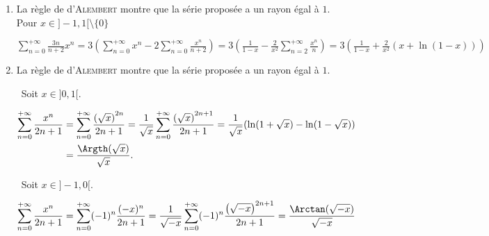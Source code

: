 {{\begin{enumerate}
\begin{center}
$f(x) =\sum_{n=2}^{+\infty}\left(\frac{1}{n-1}-\frac{1}{n}\right)x^n =x\sum_{n=2}^{+\infty}\frac{x^{n-1}}{n-1}-\sum_{n=2}^{+\infty}\frac{x^n}{n}=-x\ln(1-x) +\ln(1-x) + x$.
\end{center}

\begin{center}
\shadowbox{
$\forall x\in]-1,1[$, $\sum_{n=2}^{+\infty}\frac{x^n}{n(n-1)}=-x\ln(1-x) +\ln(1-x) + x$.
}
\end{center}

\item  La règle de d'\textsc{Alembert} montre que la série proposée a un rayon égal à $1$.
Pour $x\in]-1,1[\setminus\{0\}$

\begin{center}
$\sum_{n=0}^{+\infty}\frac{3n}{n+2}x^n =3\left(\sum_{n=0}^{+\infty}x^n - 2\sum_{n=0}^{+\infty}\frac{x^n}{n+2}\right) = 3\left(\frac{1}{1-x}- \frac{2}{x^2}\sum_{n=2}^{+\infty}\frac{x^n}{n}\right) = 3\left(\frac{1}{1-x}+\frac{2}{x^2}(x+\ln(1-x))\right)$
\end{center}

\begin{center}
\shadowbox{
$\forall x\in]-1,1[$, $\sum_{n=0}^{+\infty}\frac{3n}{n+2}x^n=\left\{
\begin{array}{l}3\left(\frac{1}{1-x}+\frac{2}{x^2}(x+\ln(1-x))\right)\;\text{si}\;x\in]-1,1[\setminus\{0\}\\
\rule{0mm}{4mm}0\;\text{si}\;x=0
\end{array}
\right.$.
}
\end{center}

\item  La règle de d'\textsc{Alembert} montre que la série proposée a un rayon égal à $1$.

\textbullet~Soit $x\in]0,1[$.

\begin{align*}\ensuremath
\sum_{n=0}^{+\infty}\frac{x^n}{2n+1}&=\sum_{n=0}^{+\infty}\frac{\left(\sqrt{x}\right)^{2n}}{2n+1}=\frac{1}{\sqrt{x}}\sum_{n=0}^{+\infty}\frac{\left(\sqrt{x}\right)^{2n+1}}{2n+1}=\frac{1}{\sqrt{x}}(\ln(1+\sqrt{x}) -\ln(1-\sqrt{x}))\\
 &=\frac{\Argth(\sqrt{x})}{\sqrt{x}}.
\end{align*}	

\textbullet~Soit $x\in]-1,0[$.

\begin{align*}\ensuremath
\sum_{n=0}^{+\infty}\frac{x^n}{2n+1}&=\sum_{n=0}^{+\infty}(-1)^n\frac{(-x)^n}{2n+1}=\frac{1}{\sqrt{-x}}\sum_{n=0}^{+\infty}(-1)^n\frac{\left(\sqrt{-x}\right)^{2n+1}}{2n+1}=\frac{\Arctan(\sqrt{-x})}{\sqrt{-x}}
\end{align*}


\end{enumerate}}}
